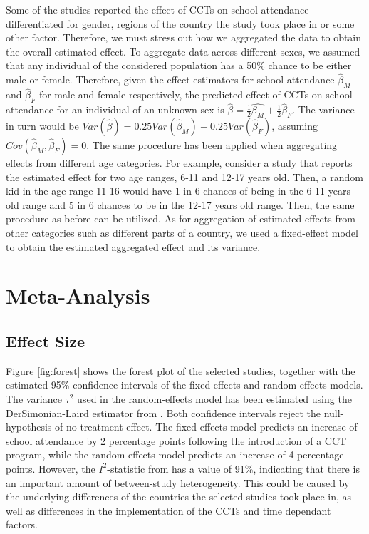 \documentclass[a4paper, 10pt]{article}
\begin{document}
Some of the studies reported the effect of CCTs on school attendance differentiated for gender, regions of the country the study took place in or some other factor. Therefore, we must stress out how we aggregated the data to obtain the overall estimated effect. To aggregate data across different sexes, we assumed that any individual of the considered population has a 50\% chance to be either male or female. Therefore, given the effect estimators for school attendance $\hat{\beta}_M$ and $\hat{\beta}_F$ for male and female respectively, the predicted effect of CCTs on school attendance for an individual of an unknown sex is $\hat{\beta}=\frac{1}{2} \hat{\beta_M} + \frac{1}{2} \hat{\beta}_F$. The variance in turn would be $Var(\hat{\beta}) = 0.25Var(\hat{\beta}_M)+0.25Var(\hat{\beta}_F)$, assuming $Cov(\hat{\beta}_M,\hat{\beta}_F)=0$. The same procedure has been applied when aggregating effects from different age categories. For example, consider a study that reports the estimated effect for two age ranges, 6-11 and 12-17 years old. Then, a random kid in the age range 11-16 would have 1 in 6 chances of being in the 6-11 years old range and 5 in 6 chances to be in the 12-17 years old range. Then, the same procedure as before can be utilized. As for aggregation of estimated effects from other categories such as different parts of a country, we used a fixed-effect model to obtain the estimated aggregated effect and its variance.


\section{Meta-Analysis} \label{sec:results}
\subsection{Effect Size}

Figure \ref{fig:forest} shows the forest plot of the selected studies, together with the estimated 95\% confidence intervals of the fixed-effects and random-effects models. The variance $\tau^2$ used in the random-effects model has been estimated using the DerSimonian-Laird estimator from \cite{dersimonian1986meta}. Both confidence intervals reject the null-hypothesis of no treatment effect. The fixed-effects model predicts an increase of school attendance by 2 percentage points following the introduction of a CCT program, while the random-effects model predicts an increase of 4 percentage points. However, the $I^2$-statistic from \cite{higgins2002quantifying} has a value of 91\%, indicating that there is an important amount of between-study heterogeneity. This could be caused by the underlying differences of the countries the selected studies took place in, as well as differences in the implementation of the CCTs and time dependant factors.
\end{document}
